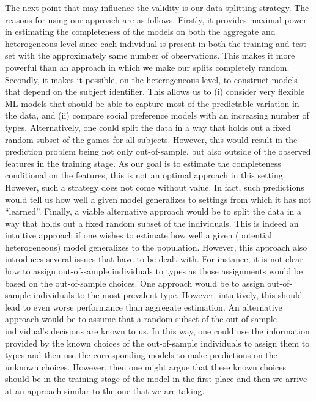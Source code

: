 \documentclass[11pt,a4paper]{article}
\theoremstyle{definition}
\begin{document}
The next point that may influence the validity is our data-splitting strategy. The reasons for using our approach are as follows. Firstly, it provides maximal power in estimating the completeness of the models on both the aggregate and heterogeneous level since each individual is present in both the training and test set with the approximately same number of observations.  This makes it more powerful than an approach in which we make our splits completely random. Secondly,  it makes it possible, on the heterogeneous level, to construct models that depend on the subject identifier. This allows us to (i) consider very flexible ML models that should be able to capture most of the predictable variation in the data, and (ii) compare social preference models with an increasing number of types.
Alternatively, one could split the data in a way that holds out a fixed random subset of the games for all subjects. However, this would result in the prediction problem being not only out-of-sample, but also outside of the observed features in the training stage. As our goal is to estimate the completeness conditional on the features, this is not an optimal approach in this setting. However, such a strategy does not come without value. In fact, such predictions would tell us how well a given model generalizes to settings from which it has not ``learned''.
Finally, a viable alternative approach would be to split the data in a way that holds out a fixed random subset of the individuals. This is indeed an intuitive approach if one wishes to estimate how well a given (potential heterogeneous) model generalizes to the population. However, this approach also introduces several issues that have to be dealt with. For instance, it is not clear how to assign out-of-sample individuals to types as those assignments would be based on the out-of-sample choices. One approach would be to assign out-of-sample individuals to the most prevalent type. However, intuitively, this should lead to even worse performance than aggregate estimation. An alternative approach would be to assume that a random subset of the out-of-sample individual's decisions are known to us.  In this way, one could use the information provided by the known choices of the out-of-sample individuals to assign them to types and then use the corresponding models to make predictions on the unknown choices.  However, then one might argue that these known choices should be in the training stage of the model in the first place and then we arrive at an approach similar to the one that we are taking.
\end{document}

